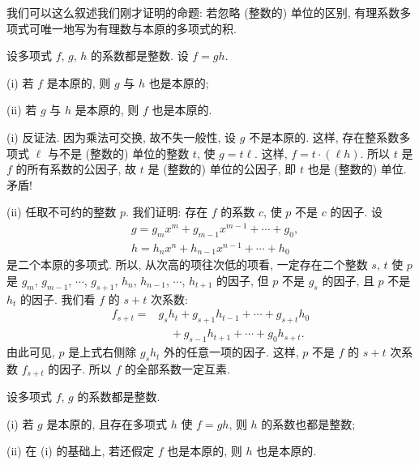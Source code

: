 \begin{remark}
    我们可以这么叙述我们刚才证明的命题: 若忽略 (整数的) 单位的区别, 有理系数多项式可唯一地写为有理数与本原的多项式的积.
\end{remark}

\begin{proposition}
    设多项式 $f$, $g$, $h$ 的系数都是整数. 设 $f = gh$.

    (i) 若 $f$ 是本原的, 则 $g$ 与 $h$ 也是本原的;

    (ii) 若 $g$ 与 $h$ 是本原的, 则 $f$ 也是本原的.
\end{proposition}

\begin{pf}
    (i) 反证法. 因为乘法可交换, 故不失一般性, 设 $g$ 不是本原的. 这样, 存在整系数多项式 $\ell$ 与不是 (整数的) 单位的整数 $t$, 使 $g = t\ell$. 这样, $f = t \cdot (\ell h)$. 所以 $t$ 是 $f$ 的所有系数的公因子, 故 $t$ 是 (整数的) 单位的公因子, 即 $t$ 也是 (整数的) 单位. 矛盾!

    (ii) 任取不可约的整数 $p$. 我们证明: 存在 $f$ 的系数 $c$, 使 $p$ 不是 $c$ 的因子. 设
    \begin{align*}
         & g = g_m x^m + g_{m-1} x^{m-1} + \cdots + g_0, \\
         & h = h_n x^n + h_{n-1} x^{n-1} + \cdots + h_0
    \end{align*}
    是二个本原的多项式. 所以, 从次高的项往次低的项看, 一定存在二个整数 $s$, $t$ 使 $p$ 是 $g_m$, $g_{m-1}$, $\cdots$, $g_{s+1}$, $h_n$, $h_{n-1}$, $\cdots$, $h_{t+1}$ 的因子, 但 $p$ 不是 $g_s$ 的因子, 且 $p$ 不是 $h_t$ 的因子. 我们看 $f$ 的 $s+t$ 次系数:
    \begin{align*}
        f_{s+t}
        = {} & g_s h_t + g_{s+1} h_{t-1} + \cdots + g_{s+t} h_0  \\
             & \quad + g_{s-1} h_{t+1} + \cdots + g_{0} h_{s+t}.
    \end{align*}
    由此可见, $p$ 是上式右侧除 $g_s h_t$ 外的任意一项的因子. 这样, $p$ 不是 $f$ 的 $s+t$ 次系数 $f_{s+t}$ 的因子. 所以 $f$ 的全部系数一定互素.
\end{pf}

\begin{proposition}
    设多项式 $f$, $g$ 的系数都是整数.

    (i) 若 $g$ 是本原的, 且存在多项式 $h$ 使 $f = gh$, 则 $h$ 的系数也都是整数;

    (ii) 在 (i) 的基础上, 若还假定 $f$ 也是本原的, 则 $h$ 也是本原的.
\end{proposition}

